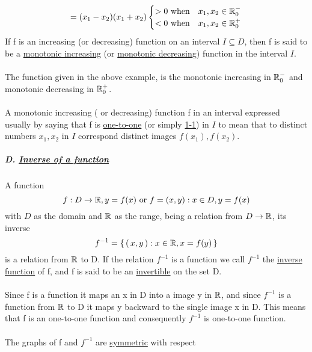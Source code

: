 \documentclass{book}
\begin{document}
\begin{align*}
	= (x_{1}-x_{2})(x_{1}+x_{2})
	\begin{cases}
		>0 \text{ when} & x_{1},x_{2} \in \mathbb{R}^{-}_{0} \\
		<0 \text{ when} & x_{1},x_{2} \in \mathbb{R}^{+}_{0}
	\end{cases}
\end{align*}
If f is an increasing (or decreasing) function on an interval $I \subseteq D$, then f is said to be a \underline{monotonic increasing} (or \underline{monotonic decreasing}) function in the interval $I$. \paragraph{} The function given in the above example, is the monotonic increasing in $\mathbb{R}^{-}_{0}$ and monotonic decreasing in $\mathbb{R}^{+}_{0}$. \paragraph{} A monotonic increasing ( or decreasing) function f in an interval expressed usually by saying that f is \underline{one-to-one} (or simply \underline{1-1}) in $I$ to mean that to distinct numbers $x_{1},x_{2}$ in $I$ correspond distinct images $f(x_{1}),f(x_{2})$.
\subparagraph*{D. \underline{Inverse of a function} }
\paragraph{}A function
\begin{equation}
	f: D \rightarrow \mathbb{R}, y = f(x)\text{ or }f = {(x,y): x\in D, y = f(x)}
\end{equation}
with $D$ as the domain and $\mathbb{R}$ as the range, being a relation from $D \rightarrow \mathbb{R}$, its inverse
\begin{equation}
f^{-1} =  \left \{ \,  \left( \, x,y \, \right) : x\in \mathbb{R},x=f(y) \, \right \} 
\end{equation}	
is a relation from $\mathbb{R}$ to D. If the relation $f^{-1}$ is a function we call $f^{-1}$ the \underline{inverse function} of f, and f is said to be an \underline{invertible} on the set D.
\paragraph{} Since f is a function it maps an x in D into a image y in $\mathbb{R}$, and since $f^{-1}$ is a function from $\mathbb{R}$ to D it maps y backward to the single image x in D. This means that f is an one-to-one function and consequently $f^{-1}$ is one-to-one function.
\paragraph{} The graphs of f and $f^{-1}$ are \underline{symmetric} with respect 
\end{document}
